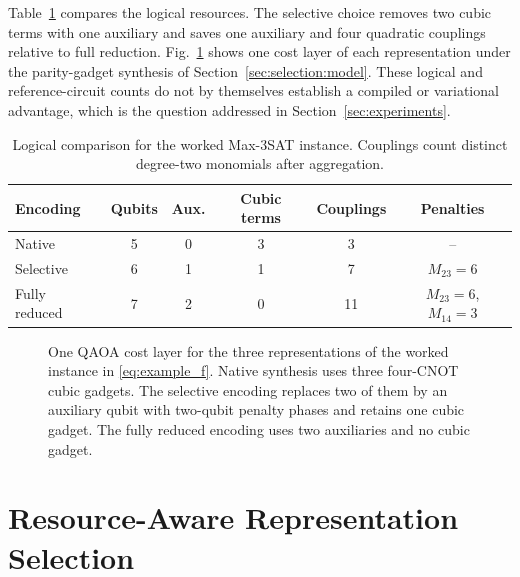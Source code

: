 \documentclass{ieeeaccess}
\begin{document}
Table~\ref{tab:example} compares the logical resources. The selective choice removes two
cubic terms with one auxiliary and saves one auxiliary and four quadratic couplings relative
to full reduction. Fig.~\ref{fig:example_circuits} shows one cost layer of each representation
under the parity-gadget synthesis of Section~\ref{sec:selection:model}. These logical and
reference-circuit counts do not by themselves establish a compiled or variational advantage,
which is the question addressed in Section~\ref{sec:experiments}.

\begin{table}[!t]
\caption{Logical comparison for the worked Max-3SAT instance. Couplings count distinct
degree-two monomials after aggregation.}
\label{tab:example}
\centering
\footnotesize
\begin{tabular}{lccccc}
\toprule
Encoding & Qubits & Aux. & Cubic terms & Couplings & Penalties \\
\midrule
Native & 5 & 0 & 3 & 3 & -- \\
Selective & 6 & 1 & 1 & 7 & $M_{23}=6$ \\
Fully reduced & 7 & 2 & 0 & 11 & $M_{23}=6$, $M_{14}=3$ \\
\bottomrule
\end{tabular}
\end{table}

\begin{figure}[!t]
\centering
\caption{One QAOA cost layer for the three representations of the worked instance in
\eqref{eq:example_f}. Native synthesis uses three four-CNOT cubic gadgets. The selective
encoding replaces two of them by an auxiliary qubit with two-qubit penalty phases and
retains one cubic gadget. The fully reduced encoding uses two auxiliaries and no cubic gadget.}
\label{fig:example_circuits}
\end{figure}

\section{Resource-Aware Representation Selection}
\label{sec:selection}
\end{document}

